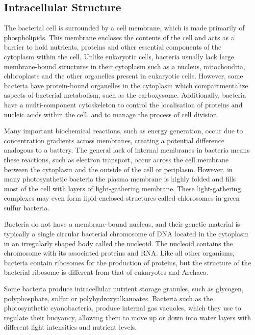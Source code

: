 \hypertarget{intracellular-structure}{%
\subsection{Intracellular Structure}\label{intracellular-structure}}

The bacterial cell is surrounded by a cell membrane, which is made primarily of phospholipids. This membrane encloses the contents of the cell and acts as a barrier to hold nutrients, proteins and other essential components of the cytoplasm within the cell. Unlike eukaryotic cells, bacteria usually lack large membrane-bound structures in their cytoplasm such as a nucleus, mitochondria, chloroplasts and the other organelles present in eukaryotic cells. However, some bacteria have protein-bound organelles in the cytoplasm which compartmentalize aspects of bacterial metabolism, such as the carboxysome. Additionally, bacteria have a multi-component cytoskeleton to control the localisation of proteins and nucleic acids within the cell, and to manage the process of cell division.

Many important biochemical reactions, such as energy generation, occur due to concentration gradients across membranes, creating a potential difference analogous to a battery. The general lack of internal membranes in bacteria means these reactions, such as electron transport, occur across the cell membrane between the cytoplasm and the outside of the cell or periplasm. However, in many photosynthetic bacteria the plasma membrane is highly folded and fills most of the cell with layers of light-gathering membrane. These light-gathering complexes may even form lipid-enclosed structures called chlorosomes in green sulfur bacteria.

Bacteria do not have a membrane-bound nucleus, and their genetic material is typically a single circular bacterial chromosome of DNA located in the cytoplasm in an irregularly shaped body called the nucleoid. The nucleoid contains the chromosome with its associated proteins and RNA. Like all other organisms, bacteria contain ribosomes for the production of proteins, but the structure of the bacterial ribosome is different from that of eukaryotes and Archaea.

Some bacteria produce intracellular nutrient storage granules, such as glycogen, polyphosphate, sulfur or polyhydroxyalkanoates. Bacteria such as the photosynthetic cyanobacteria, produce internal gas vacuoles, which they use to regulate their buoyancy, allowing them to move up or down into water layers with different light intensities and nutrient levels.

